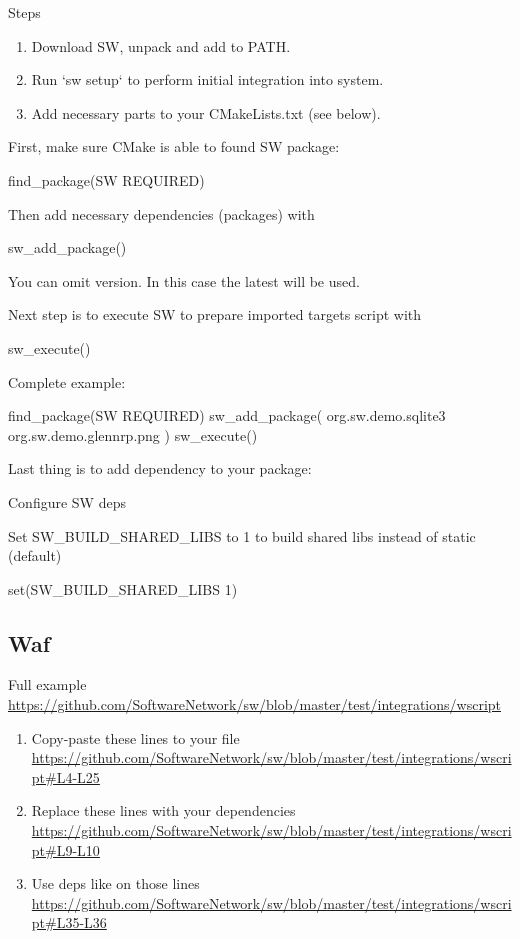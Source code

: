 Steps
\begin{enumerate}
\item
Download SW, unpack and add to PATH.
\item
Run `sw setup` to perform initial integration into system.
\item
Add necessary parts to your CMakeLists.txt (see below).
\end{enumerate}

First, make sure CMake is able to found SW package:
\begin{cmake}
find_package(SW REQUIRED)
\end{cmake}

Then add necessary dependencies (packages) with
\begin{cmake}
sw_add_package()
\end{cmake}

You can omit version. In this case the latest will be used.

Next step is to execute SW to prepare imported targets script with
\begin{cmake}
sw_execute()
\end{cmake}

Complete example:
\begin{cmake}
find_package(SW REQUIRED)
sw_add_package(
    org.sw.demo.sqlite3
    org.sw.demo.glennrp.png
)
sw_execute()
\end{cmake}

Last thing is to add dependency to your package:

Configure SW deps

Set SW_BUILD_SHARED_LIBS to 1 to build shared libs instead of static (default)
\begin{cmake}
set(SW_BUILD_SHARED_LIBS 1)
\end{cmake}


\subsection{Waf}

Full example\\
\url{https://github.com/SoftwareNetwork/sw/blob/master/test/integrations/wscript}

\begin{enumerate}
\item
Copy-paste these lines to your file \url{https://github.com/SoftwareNetwork/sw/blob/master/test/integrations/wscript#L4-L25}

\item
Replace these lines with your dependencies \url{https://github.com/SoftwareNetwork/sw/blob/master/test/integrations/wscript#L9-L10}

\item
Use deps like on those lines \url{https://github.com/SoftwareNetwork/sw/blob/master/test/integrations/wscript#L35-L36}

\end{enumerate}

